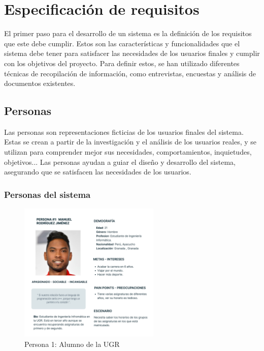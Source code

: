 \chapter{Especificación de requisitos}\label{cap:especificación}

El primer paso para el desarrollo de un sistema es la definición de los requisitos que este debe cumplir. Estos son las características y funcionalidades que el sistema debe tener para satisfacer las necesidades de los usuarios finales y cumplir con los objetivos del proyecto. \newline
Para definir estos, se han utilizado diferentes técnicas de recopilación de información, como entrevistas, encuestas y análisis de documentos existentes. 

\section{Personas}

Las personas son representaciones ficticias de los usuarios finales del sistema. Estas se crean a partir de la investigación y el análisis de los usuarios reales, y se utilizan para comprender mejor sus necesidades,
 comportamientos, inquietudes, objetivos... \newline
Las personas ayudan a guiar el diseño y desarrollo del sistema, asegurando que se satisfacen las necesidades de los usuarios.

\subsection{Personas del sistema}

\begin{figure}[H]
    \centering
    \includegraphics[width=0.6\textwidth]{figures/04_persona_1.png}
    \caption{Persona 1: Alumno de la UGR}
    \label{fig:persona_1}
\end{figure}

